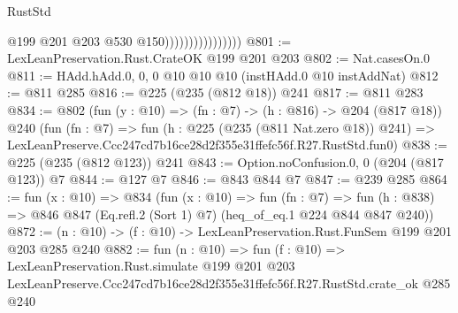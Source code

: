 \begin{lexlean}{RustStd}
\begin{coremodule}
                                    @199
                                    @201
                                    @203
                                    @530
                                    @150))))))))))))))))
@801 := LexLeanPreservation.Rust.CrateOK @199 @201 @203
@802 := Nat.casesOn.{0}
@811 := HAdd.hAdd.{0, 0, 0} @10 @10 @10 (instHAdd.{0} @10 instAddNat)
@812 := @811 @285
@816 := @225 (@235 (@812 @18)) @241
@817 := @811 @283
@834 := @802
    (fun (y : @10) => (fn : @7) -> (h : @816) -> @204 (@817 @18))
    @240
    (fun (fn : @7) =>
    fun (h : @225 (@235 (@811 Nat.zero @18)) @241) =>
    LexLeanPreserve.Ccc247cd7b16ce28d2f355e31ffefc56f.R27.RustStd.fun0)
@838 := @225 (@235 (@812 @123)) @241
@843 := Option.noConfusion.{0, 0} (@204 (@817 @123)) @7
@844 := @127 @7
@846 := @843 @844 @7
@847 := @239 @285
@864 := fun (x : @10) =>
  @834
    (fun (x : @10) =>
    fun (fn : @7) =>
    fun (h : @838) => @846 @847 (Eq.refl.{2} (Sort 1) @7) (heq_of_eq.{1} @224 @844 @847 @240))
@872 := (n : @10) -> (f : @10) -> LexLeanPreservation.Rust.FunSem @199 @201 @203 @285 @240
@882 := fun (n : @10) =>
  fun (f : @10) =>
  LexLeanPreservation.Rust.simulate
    @199
    @201
    @203
    LexLeanPreserve.Ccc247cd7b16ce28d2f355e31ffefc56f.R27.RustStd.crate_ok
    @285
    @240
\end{coremodule}
\end{lexlean}
